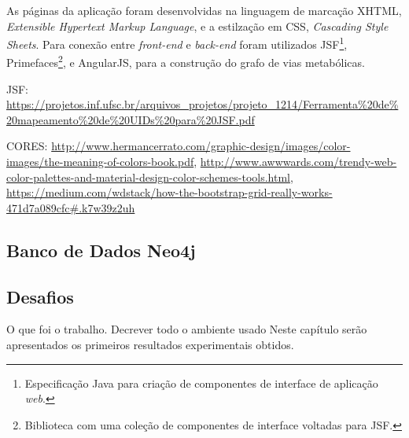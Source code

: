 \indent As páginas da aplicação foram desenvolvidas na linguagem de marcação XHTML, \textit{Extensible Hypertext Markup Language}, e a estilzação em CSS, \textit{Cascading Style Sheets}. Para conexão entre \textit{front-end} e \textit{back-end} foram utilizados JSF\footnote{Especificação Java para criação de componentes de interface de aplicação \textit{web}.}, Primefaces\footnote{Biblioteca com uma coleção de componentes de interface voltadas para JSF.}, e AngularJS, para a construção do grafo de vias metabólicas.

\indent JSF: \url{https://projetos.inf.ufsc.br/arquivos_projetos/projeto_1214/Ferramenta\%20de\%20mapeamento\%20de\%20UIDs\%20para\%20JSF.pdf}

\indent CORES: \url{http://www.hermancerrato.com/graphic-design/images/color-images/the-meaning-of-colors-book.pdf}, \url{http://www.awwwards.com/trendy-web-color-palettes-and-material-design-color-schemes-tools.html}, \url{https://medium.com/wdstack/how-the-bootstrap-grid-really-works-471d7a089cfc#.k7w39z2uh}


\subsection{Banco de Dados Neo4j}


\subsection{Desafios}
 
O que foi o trabalho. 
Decrever todo o ambiente usado
Neste capítulo serão apresentados os primeiros resultados experimentais obtidos.